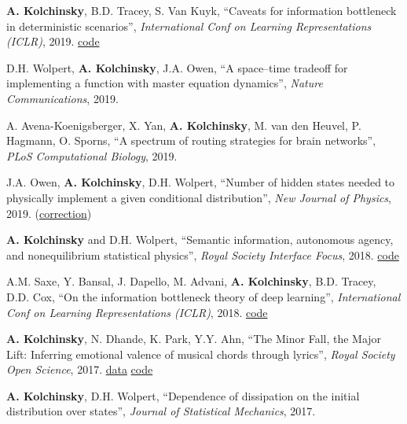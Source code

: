 \textbf{A. Kolchinsky}, B.D. Tracey, S. Van Kuyk, ``Caveats for information bottleneck in deterministic scenarios'', \emph{International Conf on Learning Representations (ICLR)}, 2019. 
\href{https://github.com/artemyk/ibcurve}{code}

D.H. Wolpert, \textbf{A. Kolchinsky}, J.A. Owen, ``A space–time tradeoff for implementing a function with master equation dynamics'', \emph{Nature Communications}, 2019. 

A. Avena-Koenigsberger, X. Yan, \textbf{A. Kolchinsky}, M. van den Heuvel, P. Hagmann, O. Sporns, 
``A spectrum of routing strategies for brain networks'', \emph{PLoS Computational Biology}, 2019. 

J.A. Owen, \textbf{A. Kolchinsky}, D.H. Wolpert, ``Number of hidden states needed to physically implement a given conditional distribution'', \emph{New Journal of Physics}, 2019. (\href{https://iopscience.iop.org/article/10.1088/1367-2630/ab60f8}{correction}) 

\textbf{A. Kolchinsky} and D.H. Wolpert, 
``Semantic information, autonomous agency, and nonequilibrium statistical physics'', 
\emph{Royal Society Interface Focus}, 2018. 
\href{https://github.com/artemyk/semantic_information/}{code}

A.M. Saxe, Y. Bansal, J. Dapello, M. Advani, \textbf{A. Kolchinsky}, B.D. Tracey, D.D. Cox, 
``On the information bottleneck theory of deep learning'', \emph{International Conf on Learning Representations (ICLR)}, 2018. 
 \href{https://github.com/artemyk/ibsgd/tree/iclr2018}{code}

\textbf{A. Kolchinsky}, N. Dhande, K. Park, Y.Y. Ahn, ``The Minor Fall, the Major Lift: Inferring emotional valence of musical chords through lyrics'', \emph{Royal Society Open Science}, 2017. 
\href{https://doi.org/10.6084/m9.figshare.5413060.v1.}{data} 
\href{https://github.com/artemyk/chordsentiment}{code}

\textbf{A. Kolchinsky}, D.H. Wolpert, ``Dependence of dissipation on the initial distribution over states'',
\emph{Journal of Statistical Mechanics}, 2017. 

